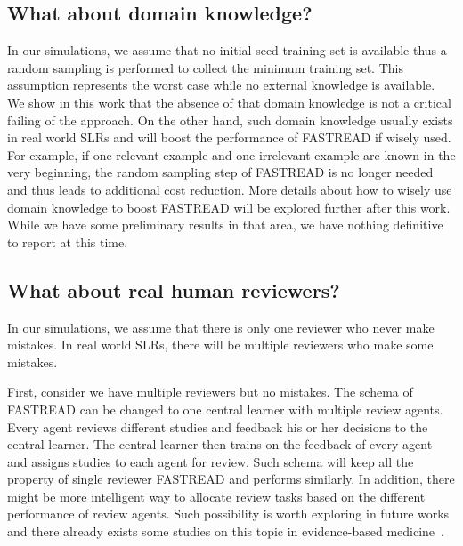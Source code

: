 \documentclass{svjour3}
\theoremstyle{break}
\begin{document}

 

\subsection{What about domain knowledge?}

In our simulations, we assume that no initial seed training set is available thus a random sampling is performed to collect the minimum training set. This assumption represents the worst case while no external knowledge is available. We show in this work that the absence of that domain knowledge is not a critical failing of the approach. On the other hand, such domain knowledge usually exists in real world SLRs and will boost the performance of FASTREAD if wisely used. For example, if one relevant example and one irrelevant example are known in the very beginning, the random sampling step of FASTREAD is no longer needed and thus leads to additional cost reduction. More details about how to wisely use domain knowledge to boost FASTREAD will be explored further after this work. While we have some preliminary results in that area, we have nothing definitive to report at this time.

\subsection{What about real human reviewers?}

In our simulations, we assume that there is only one reviewer who never make mistakes. In real world SLRs, there will be multiple reviewers who make some mistakes. 

First, consider we have multiple reviewers but no mistakes. The schema of FASTREAD can be changed to one central learner with multiple review agents. Every agent reviews different studies and feedback his or her decisions to the central learner. The central learner then trains on the feedback of every agent and assigns studies to each agent for review. Such schema will keep all the property of single reviewer FASTREAD and performs similarly. In addition, there might be more intelligent way to allocate review tasks based on the different performance of review agents. Such possibility is worth exploring in future works and there already exists some studies on this topic in evidence-based medicine~\cite{wallace2011should}.
\end{document}
